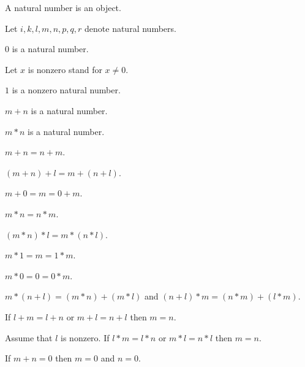 \documentclass[11pt]{article}
\begin{document}
\begin{forthel}

\begin{signature}
  A natural number is an object.
\end{signature}

Let $i,k,l,m,n,p,q,r$ denote natural numbers.

\begin{signature} $0$ is a natural number.
\end{signature}

Let $x$ is nonzero stand for $x \neq 0$.

\begin{signature}
  $1$ is a nonzero natural number.
\end{signature}

\begin{signature} $m + n$ is a natural number.
\end{signature}

\begin{signature} $m * n$ is a natural number.
\end{signature}

\begin{axiom} $m + n = n + m$.
\end{axiom}

\begin{axiom} $(m + n) + l = m + (n + l)$.
\end{axiom}

\begin{axiom}  $m + 0 = m = 0 + m$.
\end{axiom}

\begin{axiom} $m * n = n * m$.
\end{axiom}

\begin{axiom} $(m * n) * l = m * (n * l)$.
\end{axiom}

\begin{axiom} $m * 1 = m = 1 * m$.
\end{axiom}

\begin{axiom} $m * 0 = 0 = 0 * m$.
\end{axiom}

\begin{axiom} $m * (n + l) = (m * n) + (m * l)$ and
                $(n + l) * m = (n * m) + (l * m)$.
\end{axiom}

\begin{axiom} If $l + m = l + n$ or $m + l = n + l$ 
then $m = n$.
\end{axiom}

\begin{axiom} Assume that $l$ is nonzero.
If $l * m = l * n$ or $m * l = n * l$ then $m = n$.
\end{axiom}

\begin{axiom} If $m + n = 0$ then $m = 0$ and $n = 0$.
\end{axiom}

\end{forthel}
\end{document}
